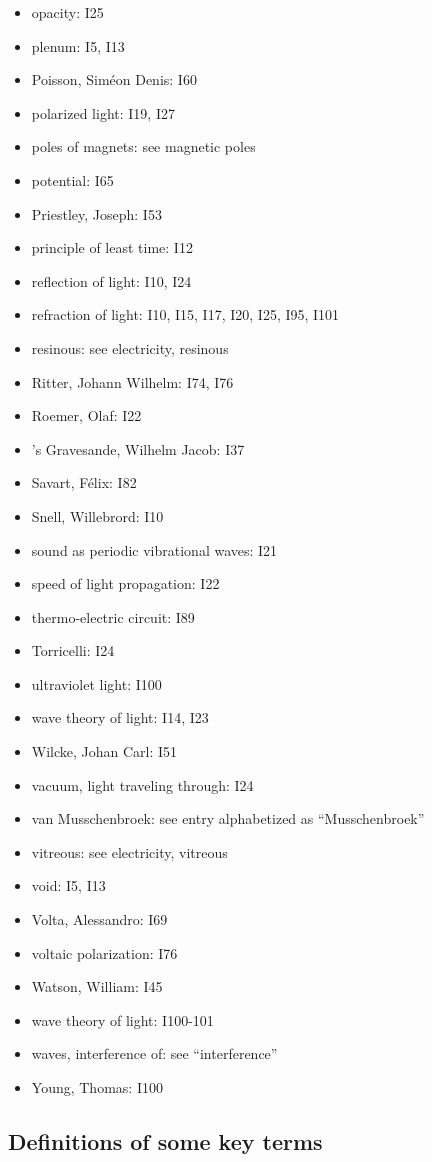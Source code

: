 \documentclass[a4paper]{article}
\theoremstyle{plain}
\theoremstyle{definition}
\begin{document}
\begin{itemize}
\item opacity: I25
\item plenum: I5, I13
\item Poisson, Sim\'{e}on Denis: I60
\item polarized light: I19, I27
\item poles of magnets: see magnetic poles
\item potential: I65
\item Priestley, Joseph: I53
\item principle of least time: I12
\item reflection of light: I10, I24
\item refraction of light: I10, I15, I17, I20, I25, I95, I101
\item resinous: see electricity, resinous
\item Ritter, Johann Wilhelm: I74, I76
\item Roemer, Olaf: I22
\item 's Gravesande, Wilhelm Jacob: I37
\item Savart, F\'{e}lix: I82
\item Snell, Willebrord: I10
\item sound as periodic vibrational waves: I21
\item speed of light propagation: I22
\item thermo-electric circuit: I89
\item Torricelli: I24
\item ultraviolet light: I100
\item wave theory of light: I14, I23
\item Wilcke, Johan Carl: I51
\item vacuum, light traveling through: I24
\item van Musschenbroek: see entry alphabetized as ``Musschenbroek''
\item vitreous: see electricity, vitreous
\item void: I5, I13
\item Volta, Alessandro: I69
\item voltaic polarization: I76
\item Watson, William: I45
\item wave theory of light: I100-101
\item waves, interference of: see ``interference''
\item Young, Thomas: I100
\end{itemize}

\subsection{Definitions of some key terms}
\end{document}
